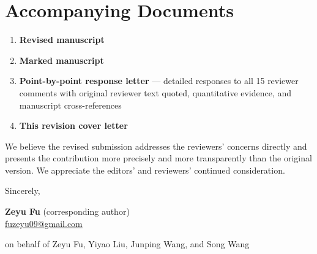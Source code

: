 \documentclass[11pt,letterpaper]{article}
\begin{document}
\section*{Accompanying Documents}

\begin{enumerate}
  \item \textbf{Revised manuscript}
  \item \textbf{Marked manuscript}
  \item \textbf{Point-by-point response letter} --- detailed responses to all 15 reviewer
    comments with original reviewer text quoted, quantitative evidence, and manuscript
    cross-references
  \item \textbf{This revision cover letter}
\end{enumerate}

\vspace{0.8em}
\noindent We believe the revised submission addresses the reviewers' concerns directly and presents
the contribution more precisely and more transparently than the original version. We appreciate the
editors' and reviewers' continued consideration.

\vspace{0.8em}
\noindent Sincerely,

\vspace{0.6em}
\noindent\textbf{Zeyu Fu} (corresponding author)\\
\href{mailto:fuzeyu09@gmail.com}{fuzeyu09@gmail.com}

\vspace{0.3em}
\noindent on behalf of Zeyu Fu, Yiyao Liu, Junping Wang, and Song Wang
\end{document}
